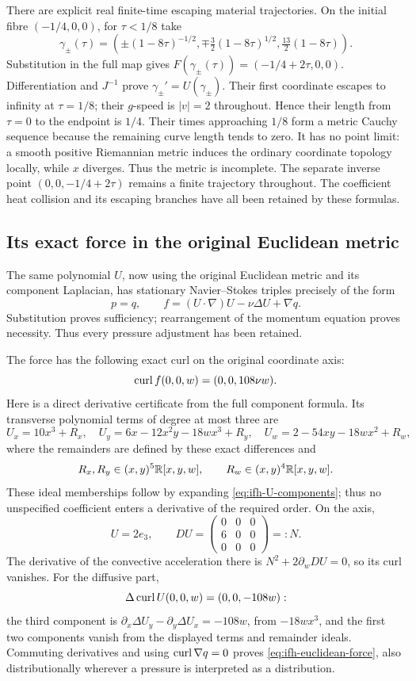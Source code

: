 There are explicit real finite-time escaping material trajectories.
On the initial fibre $(-1/4,0,0)$, for $\tau<1/8$ take
\[
 \gamma_\pm(\tau)=
 \left(\pm(1-8\tau)^{-1/2},
       \mp\tfrac32(1-8\tau)^{1/2},
       \tfrac{13}{2}(1-8\tau)\right).
\]
Substitution in the full map gives
$F(\gamma_\pm(\tau))=(-1/4+2\tau,0,0)$.
Differentiation and $J^{-1}$ prove $\gamma_\pm'=U(\gamma_\pm)$.
Their first coordinate escapes to infinity at $\tau=1/8$; their
$g$-speed is $|v|=2$ throughout. Hence their length from $\tau=0$
to the endpoint is $1/4$.
Their times approaching $1/8$ form a metric Cauchy sequence because
the remaining curve length tends to zero. It has no point limit:
a smooth positive Riemannian metric induces the ordinary coordinate
topology locally, while $x$ diverges. Thus the metric is incomplete.
The separate inverse point $(0,0,-1/4+2\tau)$ remains a finite
trajectory throughout. The coefficient heat collision and its
escaping branches have all been retained by these formulas.

\subsection{Its exact force in the original Euclidean metric}

The same polynomial $U$, now using the original Euclidean metric
and its component Laplacian, has stationary Navier--Stokes triples
precisely of the form
\[
 p=q,\qquad f=(U\cdot\nabla)U-\nu\Delta U+\nabla q .
\]
Substitution proves sufficiency; rearrangement of the momentum equation
proves necessity. Thus every pressure adjustment has been retained.

The force has the following exact curl on the original coordinate axis:
\begin{equation}
 \operatorname{curl} f(0,0,w)=(0,0,108\nu w).
 \label{eq:ifh-euclidean-force}
\end{equation}
Here is a direct derivative certificate from the full component formula.
Its transverse polynomial terms of degree at most three are
\[
 U_x=10x^3+R_x,\quad
 U_y=6x-12x^2y-18wx^3+R_y,\quad
 U_w=2-54xy-18wx^2+R_w,
\]
where the remainders are defined by these exact differences and
\[
 R_x,R_y\in(x,y)^5\mathbb R[x,y,w],\qquad
 R_w\in(x,y)^4\mathbb R[x,y,w].
\]
These ideal memberships follow by expanding
\eqref{eq:ifh-U-components}; thus no unspecified coefficient enters a
derivative of the required order. On the axis,
\[
 U=2e_3,\qquad
 DU=\begin{pmatrix}0&0&0\\6&0&0\\0&0&0\end{pmatrix}=:N .
\]
The derivative of the convective acceleration there is
$N^2+2\partial_w DU=0$, so its curl vanishes.
For the diffusive part,
\[
 \Delta\operatorname{curl} U(0,0,w)=(0,0,-108w):
\]
the third component is
$\partial_x\Delta U_y-\partial_y\Delta U_x=-108w$,
from $-18wx^3$, and the first two components vanish from the displayed
terms and remainder ideals. Commuting derivatives and using
$\operatorname{curl}\nabla q=0$ proves \eqref{eq:ifh-euclidean-force}, also
distributionally wherever a pressure is interpreted as a distribution.

